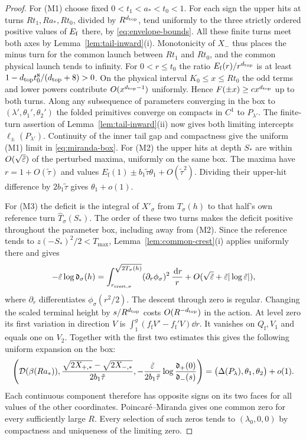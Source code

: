 \begin{proof}
For (M1) choose fixed $0<t_1<a_*<t_0<1$. For each sign the upper
hits at turns $Rt_1,Ra_*,Rt_0$, divided by $R^{d_{\rm top}}$, tend
uniformly to the three strictly ordered positive values of $E_{\rm f}$
there, by \eqref{eq:envelope-bounds}. All these finite turns meet both
axes by Lemma~\ref{lem:tail-inward}(i). Monotonicity of $X_-$ thus
places the minus turn for the common launch between $Rt_1$ and $Rt_0$,
and the common physical launch tends to infinity.
For $0<r\le t_0$ the ratio $E_{\rm f}(r)/r^{d_{\rm top}}$ is at least
$1-d_{\rm top}t_0^8/(d_{\rm top}+8)>0$. On the physical interval
$K_0\le x\le Rt_0$ the odd terms and lower powers contribute
$O(x^{d_{\rm top}-1})$ uniformly. Hence
$F(\pm x)\ge c x^{d_{\rm top}}$ up to both turns.
Along any subsequence of parameters converging in the box to
$(\lambda',\theta_1',\theta_2')$ the folded primitives converge on
compacts in $C^1$ to $P_{\lambda'}$. The finite-turn assertion of
Lemma~\ref{lem:tail-inward}(ii) now gives both limiting intercepts
$\ell_\pm(P_{\lambda'})$. Continuity of the inner tail gap and compactness
give the uniform (M1) limit in \eqref{eq:miranda-box}.
For (M2) the upper hits at depth $S_*$ are within $O(\sqrt{\tilde{\varepsilon}})$
of the perturbed maxima, uniformly on the same box. The maxima have
$r=1+O(\tilde\tau)$ and values
$E_{\mathrm f}(1)\pm b_1\tilde\tau\theta_1+O(\tilde\tau^2)$.
Dividing their upper-hit difference by $2b_1\tilde\tau$ gives
$\theta_1+o(1)$.

For (M3) the deficit is the integral of $X'_\sigma$ from
$T_\sigma(h)$ to that half's own reference turn $\widehat T_\sigma(S_*)$.
The order of these two turns makes the deficit positive throughout the
parameter box, including away from (M2). Since the reference tends to
$z(-S_*)^2/2<T_{\max}$, Lemma~\ref{lem:common-crest}\textup{(i)}
applies uniformly there and gives
\[
 -\tilde{\varepsilon}\log \mathfrak d_\sigma(h)
 =\int_{r_{\rm crest,\sigma}}^{\sqrt{2T_\sigma(h)}}
       (\partial_r\phi_\sigma)^2\,\frac{\,\mathrm{d} r}{r}
       +O(\sqrt{\tilde{\varepsilon}}+\tilde{\varepsilon}|\log\tilde{\varepsilon}|),
\]
where $\partial_r$ differentiates $\phi_\sigma(r^2/2)$.
The descent through zero is regular. Changing the scaled terminal height
by $s/R^{d_{\rm top}}$ costs $O(R^{-d_{\rm top}})$ in the action.
At level zero its first variation in direction $V$ is
$\int_1^g(f_{\mathrm f}V'-f_{\mathrm f}'V)\dd r$.
It vanishes on $Q_{\mathrm f},V_1$ and equals one on $V_2$.
Together with the first two estimates this gives the following uniform
expansion on the box:
\begin{equation}\label{eq:miranda-box}
 \left(\mathcal{D}(\beta(Ra_*)), \frac{\sqrt{2X_{+,*}}-\sqrt{2X_{-,*}}}{2b_1\tilde\tau}, -\frac{\tilde{\varepsilon}}{2b_1\tilde\tau}\log\frac{\mathfrak d_+(0)}{\mathfrak d_-(s)}\right)
 =\bigl(\Delta(P_\lambda),\theta_1,\theta_2\bigr)+o(1).
\end{equation}
Each continuous component therefore has opposite signs on its two faces
for all values of the other coordinates. Poincar\'e--Miranda gives
one common zero for every sufficiently large $R$. Every selection of
such zeros tends to $(\lambda_0,0,0)$ by compactness and uniqueness of
the limiting zero.


\end{proof}
